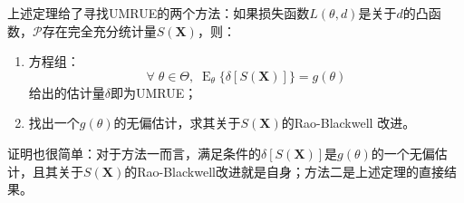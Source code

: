 \begin{note}
	上述定理给了寻找UMRUE的两个方法：如果损失函数$L(\theta,d)$是关于$d$的凸函数，$\mathscr{P}$存在完全充分统计量$S(\mathbf{X})$，则：
	\begin{enumerate}
		\item 方程组：
		\begin{equation*}
			\forall\;\theta\in\Theta,\;\operatorname{E}_{\theta}\{\delta[S(\mathbf{X})]\}=g(\theta)
		\end{equation*}
		给出的估计量$\delta$即为UMRUE；
		\item 找出一个$g(\theta)$的无偏估计，求其关于$S(\mathbf{X})$的Rao-Blackwell 改进。
	\end{enumerate}
	证明也很简单：对于方法一而言，满足条件的$\delta[S(\mathbf{X})]$是$g(\theta)$的一个无偏估计，且其关于$S(\mathbf{X})$的Rao-Blackwell改进就是自身；方法二是上述定理的直接结果。
\end{note}


